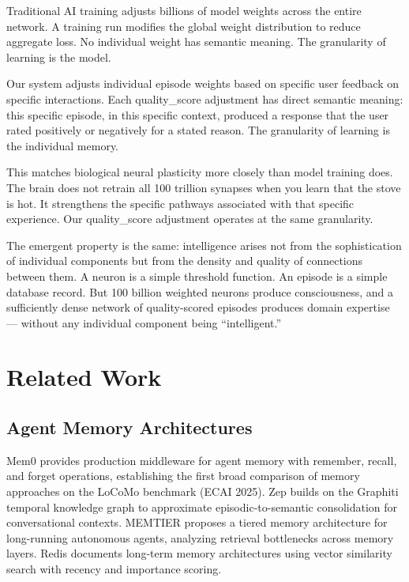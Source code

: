 \documentclass[11pt,a4paper]{article}
\begin{document}
Traditional AI training adjusts billions of model weights across the entire network. A training run modifies the global weight distribution to reduce aggregate loss. No individual weight has semantic meaning. The granularity of learning is the model.

Our system adjusts individual episode weights based on specific user feedback on specific interactions. Each quality\_score adjustment has direct semantic meaning: this specific episode, in this specific context, produced a response that the user rated positively or negatively for a stated reason. The granularity of learning is the individual memory.

This matches biological neural plasticity more closely than model training does. The brain does not retrain all 100 trillion synapses when you learn that the stove is hot. It strengthens the specific pathways associated with that specific experience. Our quality\_score adjustment operates at the same granularity.

The emergent property is the same: intelligence arises not from the sophistication of individual components but from the density and quality of connections between them. A neuron is a simple threshold function. An episode is a simple database record. But 100 billion weighted neurons produce consciousness, and a sufficiently dense network of quality-scored episodes produces domain expertise --- without any individual component being ``intelligent.''

\section{Related Work}

\subsection{Agent Memory Architectures}

Mem0 \cite{mem0} provides production middleware for agent memory with remember, recall, and forget operations, establishing the first broad comparison of memory approaches on the LoCoMo benchmark (ECAI 2025). Zep \cite{zep} builds on the Graphiti temporal knowledge graph to approximate episodic-to-semantic consolidation for conversational contexts. MEMTIER \cite{memtier} proposes a tiered memory architecture for long-running autonomous agents, analyzing retrieval bottlenecks across memory layers. Redis \cite{redis} documents long-term memory architectures using vector similarity search with recency and importance scoring.
\end{document}
